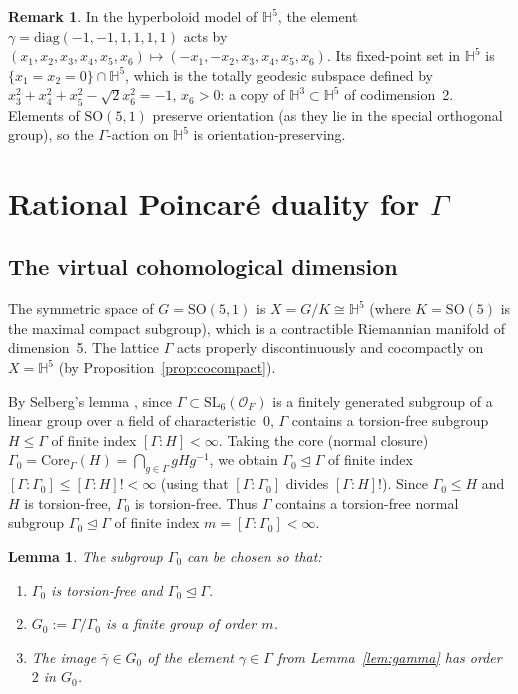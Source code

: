 \documentclass[12pt]{article}
\newtheorem{lemma}[theorem]{Lemma}
\theoremstyle{definition}
\newtheorem{remark}[theorem]{Remark}
\theoremstyle{remark}
\begin{document}
\begin{remark}
\label{rem:gamma-fixed}
In the hyperboloid model of $\mathbb{H}^5$, the element $\gamma = \mathrm{diag}(-1,-1,1,1,1,1)$
acts by $(x_1,x_2,x_3,x_4,x_5,x_6) \mapsto (-x_1,-x_2,x_3,x_4,x_5,x_6)$.
Its fixed-point set in $\mathbb{H}^5$ is $\{x_1 = x_2 = 0\} \cap \mathbb{H}^5$,
which is the totally geodesic subspace defined by $x_3^2+x_4^2+x_5^2-\sqrt{2}x_6^2 = -1$,
$x_6 > 0$: a copy of $\mathbb{H}^3 \subset \mathbb{H}^5$ of codimension~2.
Elements of $\mathrm{SO}(5,1)$ preserve orientation (as they lie in the special orthogonal
group), so the $\Gamma$-action on $\mathbb{H}^5$ is orientation-preserving.
\end{remark}

\section{Rational Poincar\'e duality for $\Gamma$}
\label{sec:vcd}

\subsection{The virtual cohomological dimension}

The symmetric space of $G = \mathrm{SO}(5,1)$ is
$X = G/K \cong \mathbb{H}^5$ (where $K = \mathrm{SO}(5)$ is the maximal compact subgroup),
which is a contractible Riemannian manifold of dimension~5. The lattice $\Gamma$
acts properly discontinuously and cocompactly on $X = \mathbb{H}^5$ (by
Proposition~\ref{prop:cocompact}).

By Selberg's lemma \cite{Selberg1960}, since $\Gamma \subset \mathrm{SL}_6(\mathcal{O}_F)$
is a finitely generated subgroup of a linear group over a field of characteristic~0,
$\Gamma$ contains a torsion-free subgroup $H \leq \Gamma$ of finite index
$[\Gamma:H] < \infty$. Taking the core (normal closure)
$\Gamma_0 = \mathrm{Core}_\Gamma(H) = \bigcap_{g\in\Gamma} gHg^{-1}$,
we obtain $\Gamma_0 \unlhd \Gamma$ of finite index $[\Gamma:\Gamma_0] \leq [\Gamma:H]! < \infty$
(using that $[\Gamma:\Gamma_0]$ divides $[\Gamma:H]!$). Since $\Gamma_0 \leq H$ and $H$
is torsion-free, $\Gamma_0$ is torsion-free. Thus $\Gamma$ contains a torsion-free normal
subgroup $\Gamma_0 \unlhd \Gamma$ of finite index $m = [\Gamma:\Gamma_0] < \infty$.

\begin{lemma}
\label{lem:selberg}
The subgroup $\Gamma_0$ can be chosen so that:
\begin{enumerate}
  \item[\textup{(a)}] $\Gamma_0$ is torsion-free and $\Gamma_0 \unlhd \Gamma$.
  \item[\textup{(b)}] $G_0 := \Gamma/\Gamma_0$ is a finite group of order $m$.
  \item[\textup{(c)}] The image $\bar\gamma \in G_0$ of the element $\gamma \in \Gamma$
        from Lemma~\ref{lem:gamma} has order~$2$ in $G_0$.
\end{enumerate}
\end{lemma}
\end{document}
